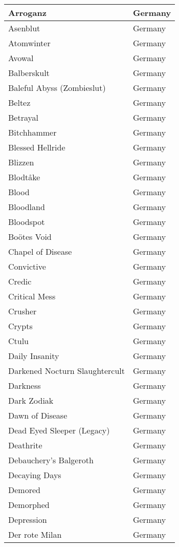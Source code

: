 \documentclass[12pt, a4paper, twoside]{report}
\begin{document}
\begin{center}
\begin{longtable}{|p{5cm}|p{5cm}|}
Arroganz & Germany \\ \hline
Asenblut & Germany \\ \hline
Atomwinter & Germany \\ \hline
Avowal & Germany \\ \hline
Balberskult & Germany \\ \hline
Baleful Abyss (Zombieslut) & Germany \\ \hline
Beltez & Germany \\ \hline
Betrayal & Germany \\ \hline
Bitchhammer & Germany \\ \hline
Blessed Hellride & Germany \\ \hline
Blizzen & Germany \\ \hline
Blodtåke & Germany \\ \hline
Blood & Germany \\ \hline
Bloodland & Germany \\ \hline
Bloodspot & Germany \\ \hline
Boötes Void & Germany \\ \hline
Chapel of Disease & Germany \\ \hline
Convictive & Germany \\ \hline
Credic & Germany \\ \hline
Critical Mess & Germany \\ \hline
Crusher & Germany \\ \hline
Crypts & Germany \\ \hline
Ctulu & Germany \\ \hline
Daily Insanity & Germany \\ \hline
Darkened Nocturn Slaughtercult & Germany \\ \hline
Darkness & Germany \\ \hline
Dark Zodiak & Germany \\ \hline
Dawn of Disease & Germany \\ \hline
Dead Eyed Sleeper (Legacy) & Germany \\ \hline
Deathrite & Germany \\ \hline
Debauchery's Balgeroth & Germany \\ \hline
Decaying Days & Germany \\ \hline
Demored & Germany \\ \hline
Demorphed & Germany \\ \hline
Depression & Germany \\ \hline
Der rote Milan & Germany \\ \hline

\end{longtable}
\end{center}
\end{document}
